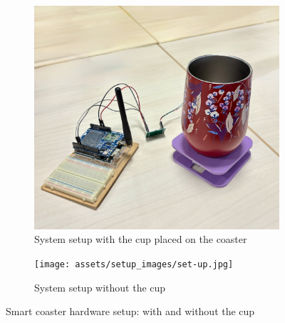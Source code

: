 \begin{figure}[H]
    \centering
    \begin{subfigure}[b]{0.45\linewidth}
        \centering
        \includegraphics[width=\linewidth]{assets/setup_images/set-up-with-cup.jpg}
        \caption{System setup with the cup placed on the coaster}
        \label{fig:setup-with-cup}
    \end{subfigure}
    \hfill
    \begin{subfigure}[b]{0.45\linewidth}
        \centering
        \texttt{[image: assets/setup\_images/set-up.jpg]}
        \caption{System setup without the cup}
        \label{fig:setup-without-cup}
    \end{subfigure}
    \caption{Smart coaster hardware setup: with and without the cup}
    \label{fig:system-setup-views}
\end{figure}

